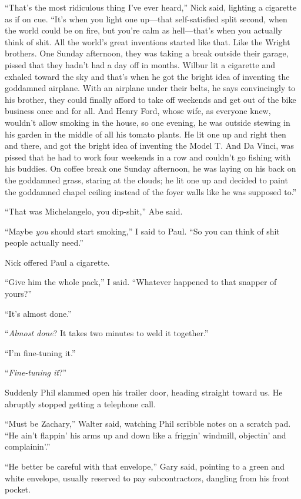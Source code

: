 ``That's the most ridiculous thing I've ever heard,'' Nick said,
lighting a cigarette as if on cue. ``It's when you light one up---that
self-satisfied split second, when the world could be on fire, but you're
calm as hell---that's when you actually think of shit. All the world's
great inventions started like that. Like the Wright brothers. One Sunday
afternoon, they was taking a break outside their garage, pissed that
they hadn't had a day off in months. Wilbur lit a cigarette and exhaled
toward the sky and that's when he got the bright idea of inventing the
goddamned airplane. With an airplane under their belts, he says
convincingly to his brother, they could finally afford to take off
weekends and get out of the bike business once and for all. And Henry
Ford, whose wife, as everyone knew, wouldn't allow smoking in the house,
so one evening, he was outside stewing in his garden in the middle of
all his tomato plants. He lit one up and right then and there, and got
the bright idea of inventing the Model T. And Da Vinci, was pissed that
he had to work four weekends in a row and couldn't go fishing with his
buddies. On coffee break one Sunday afternoon, he was laying on his back
on the goddamned grass, staring at the clouds; he lit one up and decided
to paint the goddamned chapel ceiling instead of the foyer walls like he
was supposed to.''

``That was Michelangelo, you dip-shit,'' Abe said.

``Maybe \emph{you} should start smoking,'' I said to Paul. ``So you can
think of shit people actually need.''

Nick offered Paul a cigarette.

``Give him the whole pack,'' I said. ``Whatever happened to that snapper
of yours?''

``It's almost done.''

``\emph{Almost done}? It takes two minutes to weld it together.''

``I'm fine-tuning it.''

``\emph{Fine-tuning it}?''

Suddenly Phil slammed open his trailer door, heading straight toward us.
He abruptly stopped getting a telephone call.

``Must be Zachary,'' Walter said, watching Phil scribble notes on a
scratch pad. ``He ain't flappin' his arms up and down like a friggin'
windmill, objectin' and complainin'.''

``He better be careful with that envelope,'' Gary said, pointing to a
green and white envelope, usually reserved to pay subcontractors,
dangling from his front pocket.

